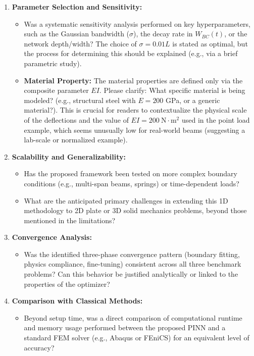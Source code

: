 \documentclass[11pt]{article}
\begin{document}
\begin{enumerate}[label=Q\arabic*.]
    \item \textbf{Parameter Selection and Sensitivity:}
    \begin{itemize}
        \item Was a systematic sensitivity analysis performed on key hyperparameters, such as the Gaussian bandwidth ($\sigma$), the decay rate in $W_{BC}(t)$, or the network depth/width? The choice of $\sigma=0.01L$ is stated as optimal, but the process for determining this should be explained (e.g., via a brief parametric study).
        \item \textbf{Material Property:} The material properties are defined only via the composite parameter $EI$. Please clarify: What specific material is being modeled? (e.g., structural steel with $E=200$ GPa, or a generic material?). This is crucial for readers to contextualize the physical scale of the deflections and the value of $EI=200\ \mathrm{N\cdot m^2}$ used in the point load example, which seems unusually low for real-world beams (suggesting a lab-scale or normalized example).
    \end{itemize}
    
    \item \textbf{Scalability and Generalizability:}
    \begin{itemize}
        \item Has the proposed framework been tested on more complex boundary conditions (e.g., multi-span beams, springs) or time-dependent loads?
        \item What are the anticipated primary challenges in extending this 1D methodology to 2D plate or 3D solid mechanics problems, beyond those mentioned in the limitations?
    \end{itemize}
    
    \item \textbf{Convergence Analysis:}
    \begin{itemize}
        \item Was the identified three-phase convergence pattern (boundary fitting, physics compliance, fine-tuning) consistent across all three benchmark problems? Can this behavior be justified analytically or linked to the properties of the optimizer?
    \end{itemize}
    
    \item \textbf{Comparison with Classical Methods:}
    \begin{itemize}
        \item Beyond setup time, was a direct comparison of computational runtime and memory usage performed between the proposed PINN and a standard FEM solver (e.g., Abaqus or FEniCS) for an equivalent level of accuracy?
    \end{itemize}
\end{enumerate}
\end{document}
